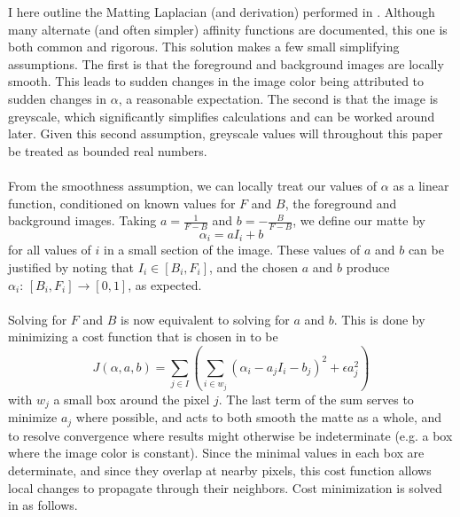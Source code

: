 I here outline the Matting Laplacian (and derivation) performed in \cite{levin08}. Although many alternate (and often simpler) affinity functions are documented, this one is both common and rigorous. This solution makes a few small simplifying assumptions. The first is that the foreground and background images are locally smooth. This leads to sudden changes in the image color being attributed to sudden changes in $\alpha$, a reasonable expectation. The second is that the image is greyscale, which significantly simplifies calculations and can be worked around later. Given this second assumption, greyscale values will throughout this paper be treated as bounded real numbers.
\\\\
From the smoothness assumption, we can locally treat our values of $\alpha$ as a linear function, conditioned on known values for $F$ and $B$, the foreground and background images. Taking $a=\frac{1}{F-B}$ and $b=-\frac{B}{F-B}$, we define our matte by
\[\alpha_i=aI_i+b\]
for all values of $i$ in a small section of the image. These values of $a$ and $b$ can be justified by noting that $I_i\in[B_i,F_i]$, and the chosen $a$ and $b$ produce $\alpha_i:\,[B_i,F_i]\to[0,1]$, as expected.
\\\\
Solving for $F$ and $B$ is now equivalent to solving for $a$ and $b$. This is done by minimizing a cost function that is chosen in \cite{levin08} to be
\[J(\alpha,a,b)=
	\sum_{j\in I}\left(\sum_{i\in w_j}\left(
		\alpha_i-a_jI_i-b_j\right)^2+\epsilon
		a_j^2\right)\]
with $w_j$ a small box around the pixel $j$. The last term of the sum serves to minimize $a_j$ where possible, and acts to both smooth the matte as a whole, and to resolve convergence where results might otherwise be indeterminate (e.g. a box where the image color is constant). Since the minimal values in each box are determinate, and since they overlap at nearby pixels, this cost function allows local changes to propagate through their neighbors. Cost minimization is solved in \cite{levin08} as follows.

